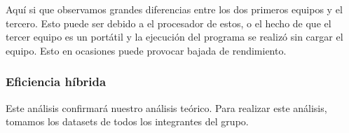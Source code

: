 \documentclass[10pt,a4paper]{article}
\begin{document}
\newpage

\begin{table}[h!]
	\centering
	\footnotesize
		\hspace{2cm}
		\hspace{2cm}
		\caption{Experiencia empírica de algoritmo de Hanoi}
\end{table}

Aquí si que observamos grandes diferencias entre los dos primeros equipos y el tercero. Esto puede ser debido a el procesador de estos, o el hecho de que el tercer equipo es un portátil y la ejecución del programa se realizó sin cargar el equipo. Esto en ocasiones puede provocar bajada de rendimiento.

\subsubsection{Eficiencia híbrida}

Este análisis confirmará nuestro análisis teórico. Para realizar este análisis, tomamos los datasets de todos los integrantes del grupo.
\end{document}
